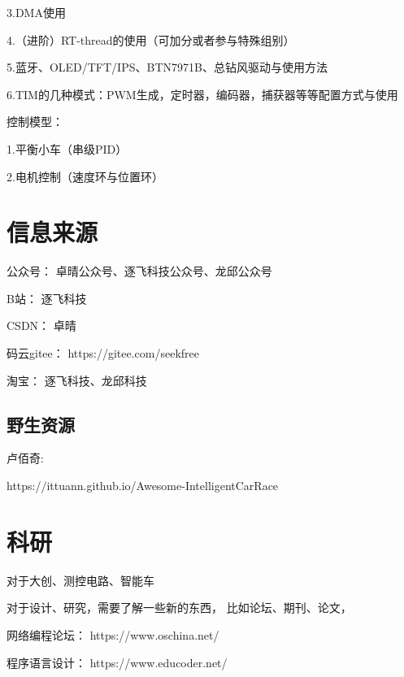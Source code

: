 \documentclass[cn,12pt]{elegantbook}
\begin{document}
3.DMA使用

4.（进阶）RT-thread的使用（可加分或者参与特殊组别）

5.蓝牙、OLED/TFT/IPS、BTN7971B、总钻风驱动与使用方法

6.TIM的几种模式：PWM生成，定时器，编码器，捕获器等等配置方式与使用

控制模型：

1.平衡小车（串级PID）

2.电机控制（速度环与位置环）


\section{信息来源}
    公众号：    卓晴公众号、逐飞科技公众号、龙邱公众号

    B站：       逐飞科技

    CSDN：      卓晴

    码云gitee： https://gitee.com/seekfree

    淘宝：      逐飞科技、龙邱科技

    \subsection{野生资源}
    
    卢佰奇:

    https://ittuann.github.io/Awesome-IntelligentCarRace


\section{科研}
    对于大创、测控电路、智能车


    对于设计、研究，需要了解一些新的东西，
    比如论坛、期刊、论文，
    
    网络编程论坛：
    https://www.oschina.net/
    
    程序语言设计：
    https://www.educoder.net/


    
\end{document}
